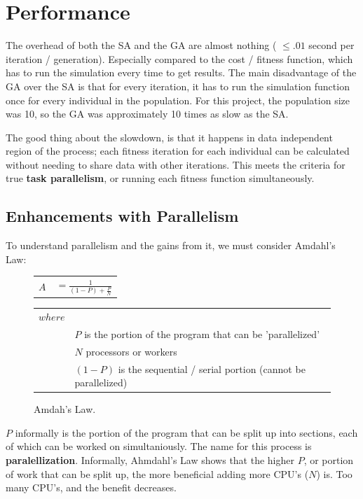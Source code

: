 \section{Performance}
The overhead of both the SA and the GA are almost nothing ( $\le .01$ second per
iteration / generation). Especially compared to the cost / fitness function,
which has to run the simulation every time to get results. The main 
disadvantage of the GA over the SA is that for every iteration, it has to run
the simulation function once for every individual in the population. For this
project, the population size was 10, so the GA was approximately 10 times
as slow as the SA.

The good thing about the slowdown, is that it happens in data independent
region of the process; each fitness iteration for each individual can be 
calculated without needing to share data with other iterations. This meets the
criteria for true \textbf{task parallelism}, or running each fitness function
simultaneously.

\subsection{Enhancements with Parallelism}
To understand parallelism and the gains from it, we must consider Amdahl's Law:
\begin{figure}[h]
	\begin{center}
		\LARGE
		\begin{tabular}{l r}
			$ A $		&	$ = \frac{1}{(1 - P) + \frac{P}{N}} $ \\
		\end{tabular}

		\normalsize
		\begin{tabular}{l l}
			$ where $  & \\
					&	$ P $ is the portion of the program that can be 'parallelized' \\
					&	$ N $ processors or workers \\
					&	$ (1 - P) $ is the sequential / serial portion (cannot be parallelized) \\
		\end{tabular}
		\caption{Amdah's Law. \cite{amdahl}} 
		\label{amdahl}
	\end{center}
\end{figure}
\normalsize

$ P $ informally is the portion of the program that can be split up into sections, each of which can be worked 
on simultaniously. The name for this process is \textbf{paralellization}. Informally, Ahmdahl's Law shows that 
the higher $ P $, or portion of work that can be split up, the more beneficial adding more CPU's ($ N $) is. Too many CPU's, and the benefit decreases.

